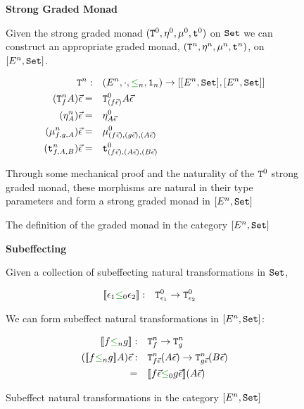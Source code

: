 \documentclass{Report}
\begin{document}
\begin{figure}
    \begin{framed}
        \centering\textbf{Strong Graded Monad}

Given the strong graded monad $(\texttt{T}^0_{}, \eta_{}^0, \mu^0, \texttt{t}^0)$ on $\texttt{Set}$ we can construct an appropriate graded monad, $(\texttt{T}^n_{}, \eta_{}^n{}{}, \mu^n,\texttt{t}^n)$, on $[E^n, \texttt{Set}]$.

\begin{align*}
    \Tn{}{}:&\quad(E^n, \dot, \subeffect_n, \1_n) \rightarrow [[E^n, \set], [E^n, \set]]\\
    (\Tn{f}{A})\ev=&\quad \Tz{(f\ev)}{A\ev}\\
    (\pointn{A})\ev=&\quad\pointz{A\ev}\\
    (\bindn{f}{g}{A})\ev=&\quad\bindz{(f\ev)}{(g\ev)}{(A\ev)}\\
    (\tstrengthn{f}{A}{B})\ev=&\quad\tstrengthz{(f\ev)}{(A\ev)}{(B\ev)}
\end{align*}

Through some mechanical proof and the naturality of the $\texttt{T}^0_{}$ strong graded monad, these morphisms are natural in their type parameters and form a strong graded monad in $[E^n, \texttt{Set}]$

    \end{framed}
    \caption{The definition of the graded monad in the category $[E^n, \texttt{Set}]$}
    \label{HowToBuildMonad}
\end{figure}


\begin{figure}
    \begin{framed}
        
        \centering\textbf{Subeffecting}


        Given a collection of subeffecting natural transformations in $\texttt{Set}$,
        
        \begin{align*}
            \deno{\e_1\subeffectz \e_2}:&\quad \Tz{\e_1}{} \rightarrow \Tz{\e_2}{}
        \end{align*}
        
        We can form subeffect natural transformations in $[E^n, \texttt{Set}]$:
        
        \begin{align*}
            \deno{f\subeffectn g}:&\quad\Tn{f}{}\rightarrow \Tn{g}{}\\
            (\deno{f\subeffectn g} A) \ev:&\quad\Tn{f\ev}{(A\ev)}\rightarrow \Tn{g\ev}{(B\ev)}\\
            =&\quad \deno{f\ev\subeffectz g\ev}(A\ev)
        \end{align*}
    \end{framed}
    \caption{Subeffect natural transformations in the category $[E^n, \texttt{Set}]$}
    \label{HowToBuildSubeffecting}
\end{figure}
\end{document}

